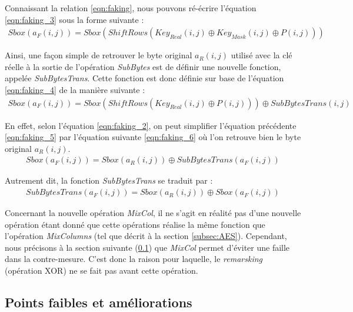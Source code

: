\documentclass[oneside]{book}
\begin{document}
\hspace{-0.5cm}Connaissant la relation \ref{eqn:faking}, nous pouvons ré-écrire l'équation \ref{eqn:faking_3} sous la forme suivante : 
\begin{gather}
	Sbox(a_{F}(i,j)) = Sbox(ShiftRows(Key_{Real}(i,j) \oplus Key_{Mask}(i,j) \oplus P(i,j)))\label{eqn:faking_4}
\end{gather}

\hspace{-0.5cm}Ainsi, une façon simple de retrouver le byte original $a_{R}(i,j)$ utilisé avec la clé réelle à la sortie de l'opération \textit{SubBytes} est de définir une nouvelle fonction, appelée \textit{SubBytesTrans}. Cette fonction est donc définie sur base de l'équation \ref{eqn:faking_4} de la manière suivante : 
\begin{gather}
	Sbox(a_{F}(i,j)) = Sbox(ShiftRows(Key_{Real}(i,j) \oplus P(i,j))) \oplus SubBytesTrans(i,j)\label{eqn:faking_5}
\end{gather}

\hspace{-0.5cm}En effet, selon l'équation \ref{eqn:faking_2}, on peut simplifier l'équation précédente \ref{eqn:faking_5} par l'équation suivante \ref{eqn:faking_6} où l'on retrouve bien le byte original $a_{R}(i,j)$.
\begin{gather}
	Sbox(a_{F}(i,j)) = Sbox(a_{R}(i,j)) \oplus SubBytesTrans(a_{F}(i,j))\label{eqn:faking_6}
\end{gather}

\hspace{-0.5cm}Autrement dit, la fonction \textit{SubBytesTrans} se traduit par :
\begin{gather}
	SubBytesTrans(a_{F}(i,j)) = Sbox(a_{R}(i,j))  \oplus Sbox(a_{F}(i,j)) \label{eqn:faking_7}
\end{gather}

\hspace{-0.5cm}Concernant la nouvelle opération \textit{MixCol}, il ne s'agit en réalité pas d'une nouvelle opération étant donné que cette opérations réalise la même fonction que l'opération \textit{MixColumns} (tel que décrit à la section \ref{subsec:AES}). Cependant, nous précisons à la section suivante (\ref{subsec:points}) que \textit{MixCol} permet d'éviter une faille dans la contre-mesure. C'est donc la raison pour laquelle, le \textit{remarsking} (opération XOR) ne se fait pas avant cette opération.

\subsection{Points faibles et améliorations}
\label{subsec:points}
\end{document}
